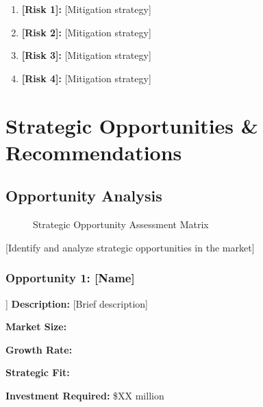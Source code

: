 \documentclass[11pt,letterpaper]{report}
\begin{document}
\begin{riskbox}
\begin{enumerate}
    \item \textbf{[Risk 1]:} [Mitigation strategy]
    \item \textbf{[Risk 2]:} [Mitigation strategy]
    \item \textbf{[Risk 3]:} [Mitigation strategy]
    \item \textbf{[Risk 4]:} [Mitigation strategy]
\end{enumerate}
\end{riskbox}

\chapter{Strategic Opportunities \& Recommendations}

\section{Opportunity Analysis}


\begin{figure}[htbp]
\centering
\caption{Strategic Opportunity Assessment Matrix}
\label{fig:opportunity_matrix}
\end{figure}

[Identify and analyze strategic opportunities in the market]

\subsection{Opportunity 1: [Name]}
\begin{opportunitybox}[Opportunity: [Name]]
\textbf{Description:} [Brief description]

\textbf{Market Size:} 

\textbf{Growth Rate:} 

\textbf{Strategic Fit:} 

\textbf{Investment Required:} \$XX million
\end{opportunitybox}
\end{document}

